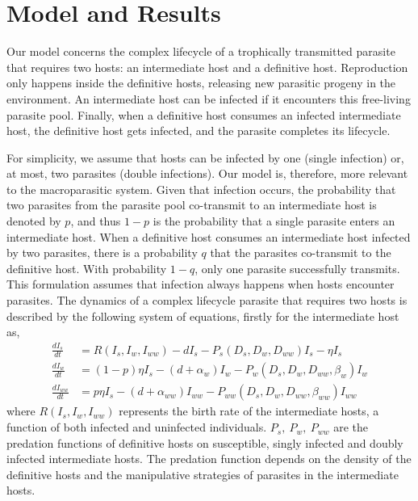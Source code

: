 \documentclass[11pt]{article}
\begin{document}
\section*{Model and Results}

Our model concerns the complex lifecycle of a trophically transmitted parasite that requires two hosts: an intermediate host and a definitive host. 
Reproduction only happens inside the definitive hosts, releasing new parasitic progeny in the environment. 
An intermediate host can be infected if it encounters this free-living parasite pool. 
Finally, when a definitive host consumes an infected intermediate host, the definitive host gets infected, and the parasite completes its lifecycle.

For simplicity, we assume that hosts can be infected by one (single infection) or, at most, two parasites (double infections). 
Our model is, therefore, more relevant to the macroparasitic system.
Given that infection occurs, the probability that two parasites from the parasite pool co-transmit to an intermediate host is denoted by  $p$, and thus $1-p$ is the probability that a single parasite enters an intermediate host. 
When a definitive host consumes an intermediate host infected by two parasites, there is a probability $q$ that the parasites co-transmit to the definitive host.
With probability $1-q$, only one parasite successfully transmits. 
This formulation assumes that infection always happens when hosts encounter parasites.
The dynamics of a complex lifecycle parasite that requires two hosts is described by the following system of equations, firstly for the intermediate host as,
%
\begin{align}
\frac{dI_s}{dt} &= R(I_s, I_w, I_{ww}) - d I_s - P_s(D_s, D_w, D_{ww}) I_s  - \eta  I_s \nonumber \\ 
\frac{dI_w}{dt} &=  (1 - p) \eta I_s  - (d + \alpha_w) I_w - P_w(D_s, D_w, D_{ww}, \beta_w) I_w \label{odes:ihosts} \\
\frac{dI_{ww}}{dt} &= p \eta I_s  - (d + \alpha_{ww}) I_{ww} - P_{ww}(D_s, D_w, D_{ww}, \beta_{ww}) I_{ww} \nonumber
\end{align}
%
where $R(I_s, I_w, I_{ww})$ represents the birth rate of the intermediate hosts, a function of both infected and uninfected individuals.
$P_s, \ P_w, \ P_{ww}$ are the predation functions of definitive hosts on susceptible, singly infected and doubly infected intermediate hosts. 
The predation function depends on the density of the definitive hosts and the manipulative strategies of parasites in the intermediate hosts. 
\end{document}
